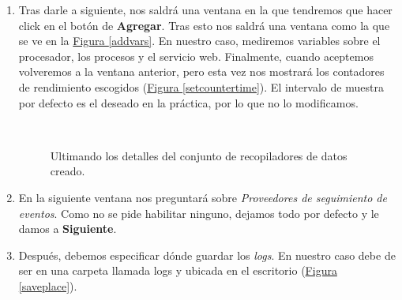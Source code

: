 \documentclass[10pt,a4paper,spanish]{article}
\numberwithin{equation}{section} %
\numberwithin{figure}{section} %
\numberwithin{table}{section} %
\begin{document}
\begin{enumerate}[1.]
    \item Tras darle a siguiente, nos saldrá una ventana en la que tendremos que hacer click en el botón de \textbf{Agregar}. Tras esto nos saldrá una ventana como la que se ve en la \hyperref[addvars]{Figura \ref*{addvars}}. En nuestro caso, mediremos variables sobre el procesador, los procesos y el servicio web. Finalmente, cuando aceptemos volveremos a la ventana anterior, pero esta vez nos mostrará los contadores de rendimiento escogidos (\hyperref[setcountertime]{Figura \ref*{setcountertime}}). El intervalo de muestra por defecto es el deseado en la práctica, por lo que no lo modificamos.
    \begin{figure}[!h]
    \centering
    \mbox {
    \qquad
    }
    \caption{Ultimando los detalles del conjunto de recopiladores de datos creado.}
    \label{ultimopaso}
    \end{figure}

    \item En la siguiente ventana nos preguntará sobre \textit{Proveedores de seguimiento de eventos}. Como no se pide habilitar ninguno, dejamos todo por defecto y le damos a \textbf{Siguiente}.

    \item Después, debemos especificar dónde guardar los \textit{logs}. En nuestro caso debe de ser en una carpeta llamada logs y ubicada en el escritorio (\hyperref[saveplace]{Figura \ref*{saveplace}}).


\end{enumerate}
\end{document}
